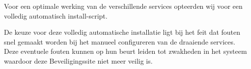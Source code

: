 Voor een optimale werking van de verschillende services opteerden wij voor een volledig automatisch install-script.

De keuze voor deze volledig automatische installatie ligt bij het feit dat fouten snel gemaakt worden bij het manueel configureren van de draaiende services. Deze eventuele fouten kunnen op hun beurt leiden tot zwakheden in het systeem waardoor deze Beveiligingssite niet meer veilig is.